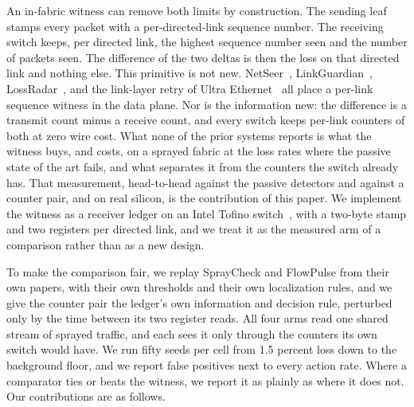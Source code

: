 An in-fabric witness can remove both limits by construction. The sending leaf stamps every packet with a per-directed-link sequence number. The receiving switch keeps, per directed link, the highest sequence number seen and the number of packets seen. The difference of the two deltas is then the loss on that directed link and nothing else. This primitive is not new. NetSeer~\cite{netseer}, LinkGuardian~\cite{linkguardian}, LossRadar~\cite{lossradar}, and the link-layer retry of Ultra Ethernet~\cite{uec} all place a per-link sequence witness in the data plane. Nor is the information new: the difference is a transmit count minus a receive count, and every switch keeps per-link counters of both at zero wire cost. What none of the prior systems reports is what the witness buys, and costs, on a sprayed fabric at the loss rates where the passive state of the art fails, and what separates it from the counters the switch already has. That measurement, head-to-head against the passive detectors and against a counter pair, and on real silicon, is the contribution of this paper. We implement the witness as a receiver ledger on an Intel Tofino switch~\cite{tofino}, with a two-byte stamp and two registers per directed link, and we treat it as the measured arm of a comparison rather than as a new design.

To make the comparison fair, we replay SprayCheck and FlowPulse from their own papers, with their own thresholds and their own localization rules, and we give the counter pair the ledger's own information and decision rule, perturbed only by the time between its two register reads. All four arms read one shared stream of sprayed traffic, and each sees it only through the counters its own switch would have. We run fifty seeds per cell from 1.5 percent loss down to the background floor, and we report false positives next to every action rate. Where a comparator ties or beats the witness, we report it as plainly as where it does not. Our contributions are as follows.

